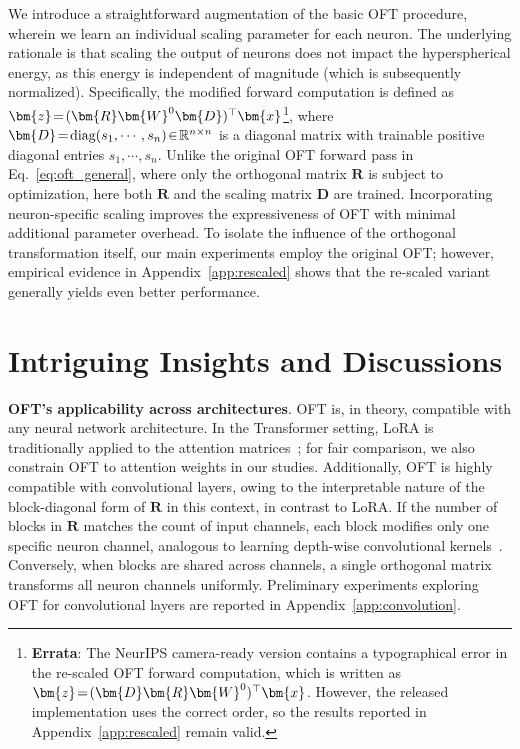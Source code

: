 We introduce a straightforward augmentation of the basic OFT procedure, wherein we learn an individual scaling parameter for each neuron. The underlying rationale is that scaling the output of neurons does not impact the hyperspherical energy, as this energy is independent of magnitude (which is subsequently normalized). Specifically, the modified forward computation is defined as $\thickmuskip=2mu \medmuskip=2mu\bm{z}=(\bm{R}\bm{W}^0\bm{D})^\top\bm{x}$\footnote{\textbf{Errata}: The NeurIPS camera-ready version contains a typographical error in the re-scaled OFT forward computation, which is written as $\thickmuskip=2mu \medmuskip=2mu\bm{z}=(\bm{D}\bm{R}\bm{W}^0)^\top\bm{x}$. However, the released implementation uses the correct order, so the results reported in Appendix~\ref{app:rescaled} remain valid.}, where $\thickmuskip=2mu \medmuskip=2mu \bm{D}=\text{diag}(s_1,\cdots,s_n)\in\mathbb{R}^{n\times n}$ is a diagonal matrix with trainable positive diagonal entries $s_1,\cdots,s_n$. Unlike the original OFT forward pass in Eq.~\eqref{eq:oft_general}, where only the orthogonal matrix $\bm{R}$ is subject to optimization, here both $\bm{R}$ and the scaling matrix $\bm{D}$ are trained. Incorporating neuron-specific scaling improves the expressiveness of OFT with minimal additional parameter overhead. To isolate the influence of the orthogonal transformation itself, our main experiments employ the original OFT; however, empirical evidence in Appendix~\ref{app:rescaled} shows that the re-scaled variant generally yields even better performance.

\section{Intriguing Insights and Discussions}

\textbf{OFT's applicability across architectures}. OFT is, in theory, compatible with any neural network architecture. In the Transformer setting, LoRA is traditionally applied to the attention matrices~\cite{hulora2022}; for fair comparison, we also constrain OFT to attention weights in our studies. Additionally, OFT is highly compatible with convolutional layers, owing to the interpretable nature of the block-diagonal form of $\bm{R}$ in this context, in contrast to LoRA. If the number of blocks in $\bm{R}$ matches the count of input channels, each block modifies only one specific neuron channel, analogous to learning depth-wise convolutional kernels~\cite{chollet2017xception}. Conversely, when blocks are shared across channels, a single orthogonal matrix transforms all neuron channels uniformly. Preliminary experiments exploring OFT for convolutional layers are reported in Appendix~\ref{app:convolution}.

